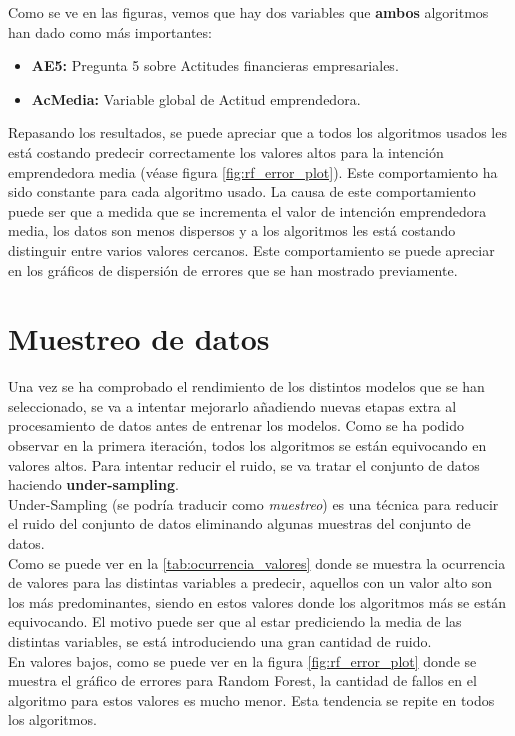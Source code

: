 Como se ve en las figuras, vemos que hay dos variables que \textbf{ambos} algoritmos han dado como más importantes:
\begin{itemize}
	\item\textbf{AE5:} Pregunta  5 sobre Actitudes financieras empresariales.
	\item\textbf{AcMedia:} Variable global de Actitud emprendedora.
\end{itemize}
Repasando los resultados, se puede apreciar que a todos los algoritmos usados les está costando predecir correctamente los valores altos para la intención emprendedora media (véase figura \ref{fig:rf_error_plot}). Este comportamiento ha sido constante para cada algoritmo usado. La causa de este comportamiento puede ser que a medida que se incrementa el valor de intención emprendedora media, los datos son menos dispersos y a los algoritmos les está costando distinguir entre varios valores cercanos. Este comportamiento se puede apreciar en los gráficos de dispersión de errores que se han mostrado previamente.
\pagebreak
\section{Muestreo de datos}
Una vez se ha comprobado el rendimiento de los distintos modelos que se han seleccionado, se va a intentar mejorarlo añadiendo nuevas etapas extra al procesamiento de datos antes de entrenar los modelos.
\newline
Como se ha podido observar en la primera iteración, todos los algoritmos se están equivocando en valores altos. Para intentar reducir el ruido, se va tratar el conjunto de datos haciendo \textbf{under-sampling}.\\
Under-Sampling (se podría traducir como \textit{muestreo}) es una técnica para reducir el ruido del conjunto de datos eliminando algunas muestras del conjunto de datos.\\
\linebreak
Como se puede ver en la \ref{tab:ocurrencia_valores} donde se muestra la ocurrencia de valores para las distintas variables a predecir,  aquellos con un valor alto son los más predominantes, siendo en estos valores donde los algoritmos más se están equivocando. El motivo puede ser que al estar prediciendo la media de las distintas variables, se está introduciendo una gran cantidad de ruido. \\
En valores bajos, como se puede ver en la figura \ref{fig:rf_error_plot} donde se muestra el gráfico de errores para Random Forest, la cantidad de fallos en el algoritmo para estos valores es mucho menor. Esta tendencia se repite en todos los algoritmos.\\
